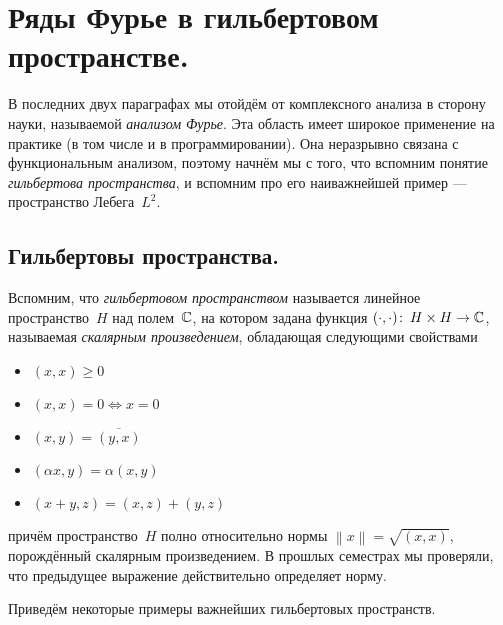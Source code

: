 \documentclass[../complex-analysis.tex]{subfiles}
\begin{document}
\newpage
\section{Ряды Фурье в гильбертовом пространстве.}

В последних двух параграфах мы отойдём от комплексного анализа в сторону науки, называемой \emph{анализом Фурье}. Эта область имеет широкое применение на практике (в том числе и в программировании). Она неразрывно связана с функциональным анализом, поэтому начнём мы с того, что вспомним понятие \emph{гильбертова пространства}, и вспомним про его наиважнейшей пример --- пространство Лебега~$ L^{2} $.

\subsection{Гильбертовы пространства.}

Вспомним, что \textit{гильбертовом пространством} называется линейное пространство~$ H $ над полем~$ \mathbb{C} $, на котором задана функция $ (\cdot,\cdot) \colon\, H \times H \to \mathbb{C} $, называемая \textit{скалярным произведением}, обладающая следующими свойствами
\begin{itemize}
 \item $ (x,x) \geqslant 0 $
 \item $ (x,x) = 0 \iff x = 0 $
 \item $ (x,y) = \overline{(y,x)} $
 \item $ (\alpha x, y) = \alpha(x,y) $
 \item $ (x + y, z) = (x,z) + (y,z) $
\end{itemize} причём пространство~$ H $ полно относительно нормы $ \left\| x \right\|  = \sqrt{(x,x)}$, порождённый скалярным произведением. В прошлых семестрах мы проверяли, что предыдущее выражение действительно определяет норму. 

Приведём некоторые примеры важнейших гильбертовых пространств.
\end{document}
